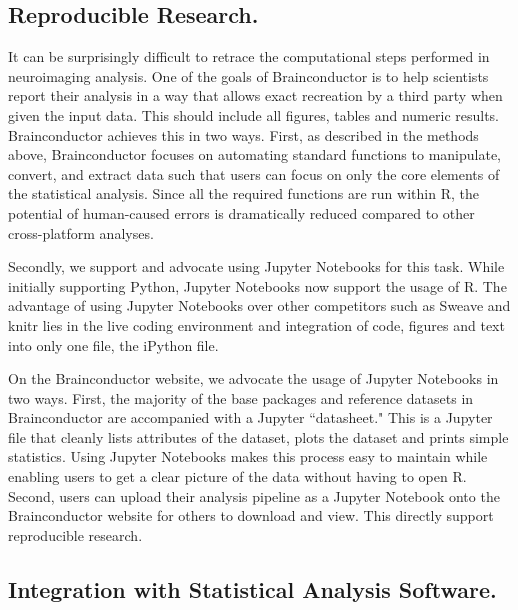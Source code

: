 \documentclass{nature}
\begin{document}
\subsection{Reproducible Research.}

It can be surprisingly difficult to retrace the computational steps performed
in neuroimaging analysis. One of the goals of Brainconductor is to help
scientists report their analysis in a way that allows exact recreation by
a third party when given the input data. This should include all figures,
tables and numeric results. Brainconductor achieves this in two ways.
First, as described in the methods above, Brainconductor focuses on automating
standard functions to manipulate, convert, and extract data such that users
can focus on only the core elements of the statistical analysis. Since all the
required functions are run within R, the potential of human-caused errors is
dramatically reduced compared to other cross-platform analyses.

Secondly, we support and advocate using Jupyter Notebooks for
this task. While initially supporting Python, Jupyter Notebooks now support
the usage of R. The advantage of using Jupyter Notebooks over other competitors
such as Sweave and knitr lies in the live coding environment and
integration of code, figures and text into only one file, the iPython file.

On the Brainconductor website, we advocate the usage of Jupyter Notebooks
in two ways. First, the majority of the base packages and reference datasets
in Brainconductor are accompanied with a Jupyter ``datasheet." This is a
Jupyter file that cleanly lists attributes of the dataset, plots the dataset
and prints simple statistics. Using Jupyter Notebooks makes this process easy
to maintain while enabling users to get a clear picture of the data without
having to open R. Second, users can upload their analysis pipeline as a Jupyter
Notebook onto the Brainconductor website for others to download and view. This
directly support reproducible research.




\subsection{Integration with Statistical Analysis Software.}
\end{document}
